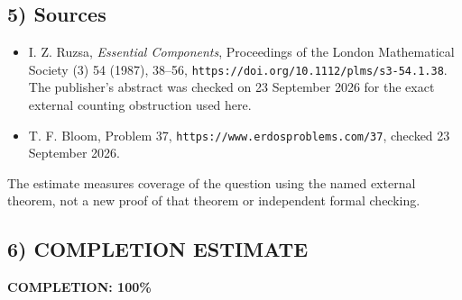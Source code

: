 \subsection{5) Sources}
\begin{itemize}
\item I. Z. Ruzsa, \emph{Essential Components}, Proceedings of the
London Mathematical Society (3) 54 (1987), 38--56,
\texttt{https://doi.org/10.1112/plms/s3-54.1.38}. The publisher's
abstract was checked on 23 September 2026 for the exact external
counting obstruction used here.
\item T. F. Bloom, Problem 37,
\texttt{https://www.erdosproblems.com/37}, checked 23 September 2026.
\end{itemize}

The estimate measures coverage of the question using the named external
theorem, not a new proof of that theorem or independent formal checking.
\subsection{6) COMPLETION ESTIMATE}
\textbf{COMPLETION: 100\%}
